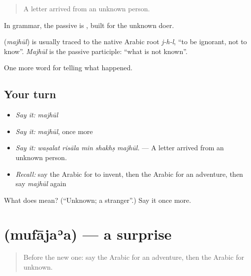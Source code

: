 \begin{quote}
A letter arrived from an unknown person.
\end{quote}

In grammar, the passive is  , built for the unknown doer.

\begin{cousinweb}
\textbf{} (\emph{majhūl}) is usually traced to the native Arabic root \emph{j-h-l}, \textquotedblleft{}to be ignorant, not to know\textquotedblright{}. \emph{Majhūl} is the passive participle: \textquotedblleft{}what is not known\textquotedblright{}.
\end{cousinweb}

\begin{grammarlens}[title={What you've built}]
One more word for telling what happened.
\end{grammarlens}

\subsection*{Your turn}
\begin{itemize}
\raggedright
  \item \emph{Say it:} \emph{majhūl}
  \item \emph{Say it:} \emph{majhūl}, once more
  \item \emph{Say it:} \emph{waṣalat risāla min shakhṣ majhūl.} — A letter arrived from an unknown person.
  \item \emph{Recall:} say the Arabic for to invent, then the Arabic for an adventure, then say \emph{majhūl} again
\end{itemize}

\begin{tcolorbox}[breakable,colback=teal!4,colframe=teal!35!black,title={Before you move on}]
What does  mean? (\textquotedblleft{}Unknown; a stranger\textquotedblright{}.) Say it once more.
\end{tcolorbox}
\section[\texorpdfstring{\ar{مفاجأة} (mufājaʾa)}{مفاجأة (mufājaʾa)}]{ (mufājaʾa) — a surprise}

\label{lesson:AR-C343-mufajaa}



\begin{quote}
Before the new one: say the Arabic for an adventure, then the Arabic for unknown.
\end{quote}

